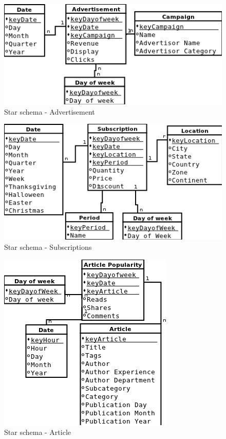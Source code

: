 
\begin{figure}[!hbp]
\begin{center}
    \includegraphics[scale=0.5]{schema_star_advertisement}
\caption{\label{pic:st_adv} Star schema - Advertisement}
\end{center}
\end{figure}

\begin{figure}[!hbp]
\begin{center}
    \includegraphics[scale=0.5]{schema_star_subscriptions}
\caption{\label{pic:st_sub}  Star schema - Subscriptions}
\end{center}
\end{figure}

\begin{figure}[!hbp]
\begin{center}
    \includegraphics[scale=0.5]{schema_star_article}
\caption{\label{pic:st_art}  Star schema - Article}
\end{center}
\end{figure}

\clearpage
